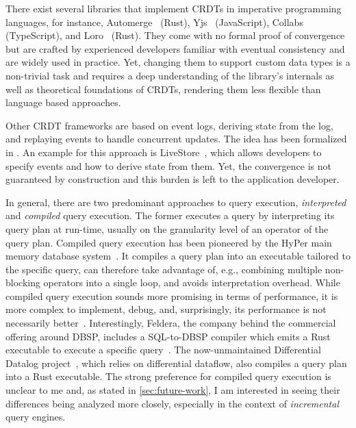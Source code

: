 There exist several libraries that implement \acp{CRDT} in imperative programming
languages, for instance, Automerge~\cite{automerge} (Rust),
Yjs~\cite{yjs} (JavaScript), Collabs~\cite{collabs} (TypeScript),
and Loro~\cite{loro} (Rust).
They come with no formal proof of convergence but are crafted by experienced
developers familiar with eventual consistency and are widely used in practice.
Yet, changing them to support custom data types is a non-trivial task and
requires a deep understanding of the library's internals as well as theoretical
foundations of \acp{CRDT}, rendering them less flexible than language based
approaches.

Other \ac{CRDT} frameworks are based on event logs, deriving state from the log,
and replaying events to handle concurrent updates.
The idea has been formalized in \cite{egwalker}.
An example for this approach is LiveStore~\cite{livestore}, which allows
developers to specify events and how to derive state from them.
Yet, the convergence is not guaranteed by construction and this burden is
left to the application developer.

In general, there are two predominant approaches to query execution,
\emph{interpreted} and \emph{compiled} query execution.
The former executes a query by interpreting its query plan at run-time,
usually on the granularity level of an operator of the query plan.
Compiled query execution has been pioneered by the HyPer main memory database
system~\cite{neumann2011efficiently}.
It compiles a query plan into an executable tailored to the specific query,
can therefore take advantage of, e.g., combining multiple non-blocking operators
into a single loop, and avoids interpretation overhead.
While compiled query execution sounds more promising in terms of performance,
it is more complex to implement, debug, and, surprisingly, its performance
is not necessarily better~\cite{kersten2018everything}.
Interestingly, Feldera, the company behind the commercial offering around DBSP,
includes a SQL-to-DBSP compiler which emits a Rust executable to execute a
specific query~\cite{feldera}.
The now-unmaintained Differential Datalog project~\cite{ddlog},
which relies on differential dataflow, also compiles a query plan into a
Rust executable.
The strong preference for compiled query execution is unclear to me and,
as stated in \ref{sec:future-work}, I am interested in seeing their differences
being analyzed more closely, especially in the context of \emph{incremental}
query engines.
